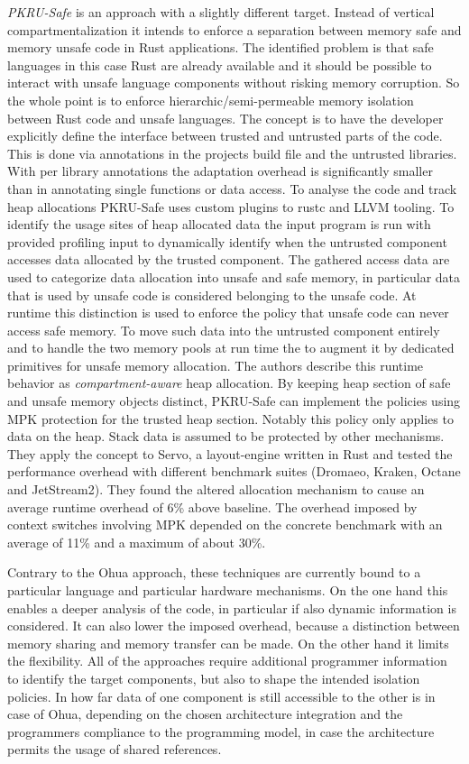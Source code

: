  \emph{PKRU-Safe}\cite{kirth2022pkru} is an approach with a slightly different target. Instead of vertical compartmentalization it intends to enforce a separation between memory safe and memory unsafe code in Rust applications. The identified problem is that safe languages in this case Rust are already available and it should be possible to interact with unsafe language components without risking memory corruption. So the whole point is to enforce hierarchic/semi-permeable memory isolation between Rust code and unsafe languages. The concept is to have the developer explicitly define the interface between trusted and untrusted parts of the code. This is done via annotations in the projects build file and the untrusted libraries. With per library annotations the adaptation overhead is significantly smaller than in annotating single functions or data access. To analyse the code and track heap allocations PKRU-Safe uses custom plugins to rustc and LLVM tooling. To identify the usage sites of heap allocated data the input program is run with provided profiling input to dynamically identify when the untrusted component accesses data allocated by the trusted component. The gathered access data are used to categorize data allocation into unsafe and safe memory, in particular data that is used by unsafe code is considered belonging to the unsafe code. At runtime this distinction is used to enforce the policy that unsafe code can never access safe memory. To move such data into the untrusted component entirely and to handle the two memory pools at run time the  to augment it by dedicated primitives for unsafe memory allocation. The authors describe this runtime behavior as \emph{compartment-aware} heap allocation. By keeping heap section of safe and unsafe memory objects distinct, PKRU-Safe can implement the policies using MPK protection for the trusted heap section. Notably this policy only applies to data on the heap. Stack data is assumed to be protected by other mechanisms. They apply the concept to Servo, a layout-engine written in Rust and tested the performance overhead with different benchmark suites (Dromaeo, Kraken, Octane and JetStream2). They found the altered allocation mechanism to cause an average runtime overhead of 6\% above baseline. The overhead imposed by context switches  involving MPK depended on the concrete benchmark with an average of 11\% and a maximum of about 30\%. 

Contrary to the Ohua approach, these techniques are currently bound to a particular language and particular hardware mechanisms. On the one hand this enables a deeper analysis of the code, in particular if also dynamic information is considered. It can also lower the imposed overhead, because a distinction between memory sharing and memory transfer can be made. On the other hand it limits the flexibility. All of the approaches require additional programmer information to identify the target components, but also to shape the intended isolation policies. In how far data of one component is still accessible to the other is in case of Ohua, depending on the chosen architecture integration and the programmers compliance to the programming model, in case the architecture permits the usage of shared references. 
